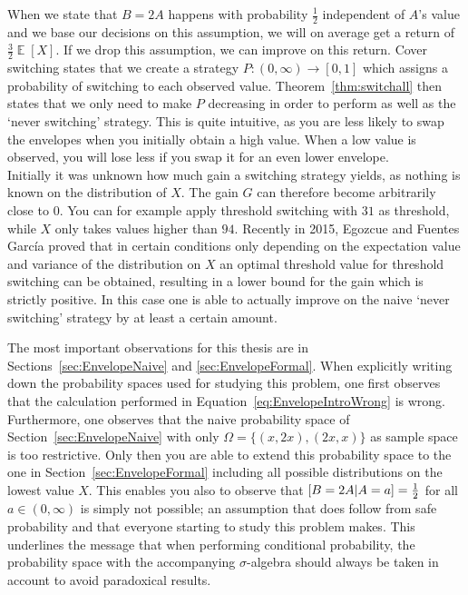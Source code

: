 \documentclass[a4paper]{report}
\theoremstyle{plain}
\theoremstyle{definition}
\theoremstyle{remark}
\numberwithin{equation}{chapter}
\let\P\relax
\DeclareMathOperator{\P}{\mathbb{P}}
\DeclareMathOperator{\E}{\mathbb{E}}
\DeclareMathOperator{\1}{\mathbbm{1}}
\begin{document}
When we state that $B=2A$ happens with probability $\frac{1}{2}$ independent of $A$'s value and we base our decisions on this assumption, we will on average get a return of $\frac{3}{2}\E[X]$. If we drop this assumption, we can improve on this return. Cover switching states that we create a strategy $P\colon(0,\infty)\to[0,1]$ which assigns a probability of switching to each observed value. Theorem~\ref{thm:switchall} then states that we only need to make $P$ decreasing in order to perform as well as the `never switching' strategy. This is quite intuitive, as you are less likely to swap the envelopes when you initially obtain a high value. When a low value is observed, you will lose less if you swap it for an even lower envelope.\\
Initially it was unknown how much gain a switching strategy yields, as nothing is known on the distribution of $X$. The gain $G$ can therefore become arbitrarily close to $0$. You can for example apply threshold switching with $31$ as threshold, while $X$ only takes values higher than $94$. Recently in 2015, Egozcue and Fuentes García \cite{Egozcue15} proved that in certain conditions only depending on the expectation value and variance of the distribution on $X$ an optimal threshold value for threshold switching can be obtained, resulting in a lower bound for the gain which is strictly positive. In this case one is able to actually improve on the naive `never switching' strategy by at least a certain amount.

The most important observations for this thesis are in Sections~\ref{sec:EnvelopeNaive} and \ref{sec:EnvelopeFormal}. When explicitly writing down the probability spaces used for studying this problem, one first observes that the calculation performed in Equation~\ref{eq:EnvelopeIntroWrong} is wrong. Furthermore, one observes that the naive probability space of Section~\ref{sec:EnvelopeNaive} with only $\Omega=\{(x,2x),(2x,x)\}$ as sample space is too restrictive. Only then you are able to extend this probability space to the one in Section~\ref{sec:EnvelopeFormal} including all possible distributions on the lowest value $X$. This enables you also to observe that $\P[B=2A|A=a]=\frac{1}{2}$ for all $a\in(0,\infty)$ is simply not possible; an assumption that does follow from safe probability and that everyone starting to study this problem makes. This underlines the message that when performing conditional probability, the probability space with the accompanying $\sigma$-algebra should always be taken in account to avoid paradoxical results.
\end{document}
